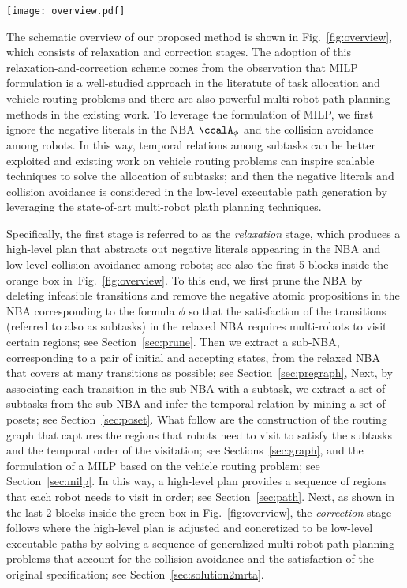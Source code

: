 \documentclass[Afour,sageh,times]{sagej}
\newcommand{\autop}{\ccalA_{\phi}}
\begin{document}
 \begin{figure*}[!t]
   \centering
\texttt{[image: overview.pdf]}
   \caption{Schematic overview of the proposed method.  The first 5 boxes correspond to the relaxation stage and the last two constitute the correction stage.}
\label{fig:overview}
 \end{figure*}
     {The schematic overview of our proposed  method is shown in Fig.~\ref{fig:overview}, which consists of relaxation and correction stages.  The adoption of this relaxation-and-correction scheme comes from the observation that MILP formulation is a well-studied approach in the literatute of task allocation and  vehicle routing problems and there are also powerful  multi-robot path planning methods in the existing work. To leverage the formulation of MILP, we first ignore the negative literals in the NBA $\autop$ and the collision avoidance among robots. In this way, temporal relations among subtasks can be better exploited  and existing work on vehicle routing problems can inspire scalable techniques to solve the allocation of subtasks; and then the negative literals and collision avoidance is considered in the low-level executable path generation by leveraging the state-of-art multi-robot plath planning techniques.

       Specifically, the first stage is referred to as the {\it relaxation} stage, which produces a high-level plan that abstracts out negative literals appearing in the NBA and low-level collision avoidance among robots; see also the first 5 blocks inside the orange box in~Fig.~\ref{fig:overview}. To this end, we first prune the NBA by deleting infeasible transitions and remove  the negative atomic propositions in the NBA corresponding to the formula $\phi$ so that the satisfaction of the transitions (referred to also as subtasks) in the relaxed NBA requires multi-robots to visit certain regions; see Section~\ref{sec:prune}. Then we extract a sub-NBA, corresponding to a pair of initial and accepting states, from the relaxed NBA that covers at many transitions as possible; see Section~\ref{sec:pregraph}, Next, by associating each transition in the sub-NBA with a subtask, we extract a set of subtasks from the sub-NBA and infer the temporal relation by mining a set of posets; see Section~\ref{sec:poset}. What follow are the construction of the routing graph that captures the regions that robots need to visit to satisfy the subtasks and the temporal order of the visitation; see Sections~\ref{sec:graph}, and the formulation of a MILP based on the vehicle routing problem; see Section~\ref{sec:milp}. In this way, a high-level plan  provides a sequence of regions that each robot needs to visit in order; see Section~\ref{sec:path}. Next, as shown in the last 2 blocks inside the green box in Fig.~\ref{fig:overview}, the {\it correction} stage follows  where the high-level plan is adjusted and concretized to be low-level executable paths by solving a sequence of generalized multi-robot path planning problems that account for the collision avoidance and the satisfaction of the  original specification; see Section~\ref{sec:solution2mrta}.

}
\end{document}
